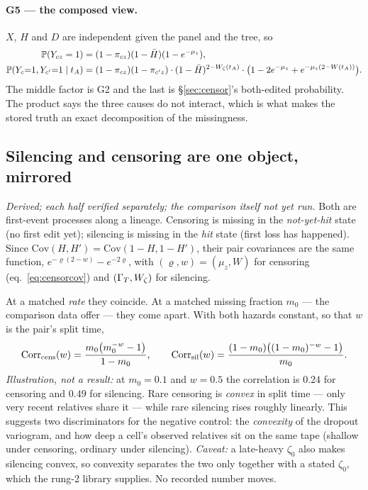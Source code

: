 \paragraph{G5 --- the composed view.} $X$, $H$ and $D$ are independent given the panel and the tree, so
\begin{align}
  \mathbb{P}(Y_{cz}=1)&=(1-\pi_{cz})(1-\bar H)(1-e^{-\mu_z}),\nonumber\\
  \mathbb{P}(Y_c{=}1,Y_{c'}{=}1\mid t_A)&=(1-\pi_{cz})(1-\pi_{c'z})\cdot(1-\bar H)^{2-W_\zeta(t_A)}\cdot
  \big(1-2e^{-\mu_z}+e^{-\mu_z(2-W(t_A))}\big).
  \label{eq:G5}
\end{align}
The middle factor is G2 and the last is \S\ref{sec:censor}'s both-edited probability. The product says
the three causes do not interact, which is what makes the stored truth an exact decomposition of the
missingness.

\subsection{Silencing and censoring are one object, mirrored}\label{sec:mirror}

\emph{Derived; each half verified separately; the comparison itself not yet run.} Both are first-event
processes along a lineage. Censoring is missing in the \emph{not-yet-hit} state (no first edit yet);
silencing is missing in the \emph{hit} state (first loss has happened). Since
$\mathrm{Cov}(H,H')=\mathrm{Cov}(1-H,1-H')$, their pair covariances are the same function,
$e^{-\varrho(2-w)}-e^{-2\varrho}$, with $(\varrho,w)=(\mu_z,W)$ for censoring
(eq.~\ref{eq:censorcov}) and $(\Gamma_T,W_\zeta)$ for silencing.

At a matched \emph{rate} they coincide. At a matched missing fraction $m_0$ --- the comparison data
offer --- they come apart. With both hazards constant, so that $w$ is the pair's split time,
\begin{equation}
  \mathrm{Corr}_{\rm cens}(w)=\frac{m_0\big(m_0^{-w}-1\big)}{1-m_0},\qquad
  \mathrm{Corr}_{\rm sil}(w)=\frac{(1-m_0)\big((1-m_0)^{-w}-1\big)}{m_0}.
  \label{eq:mirror}
\end{equation}
\emph{Illustration, not a result:} at $m_0=0.1$ and $w=0.5$ the correlation is $0.24$ for censoring and
$0.49$ for silencing. Rare censoring is \emph{convex} in split time --- only very recent relatives share
it --- while rare silencing rises roughly linearly. This suggests two discriminators for the negative
control: the \emph{convexity} of the dropout variogram, and how deep a cell's observed relatives sit on
the same tape (shallow under censoring, ordinary under silencing). \emph{Caveat:} a late-heavy
$\zeta_0$ also makes silencing convex, so convexity separates the two only together with a stated
$\zeta_0$, which the rung-2 library supplies. No recorded number moves.

